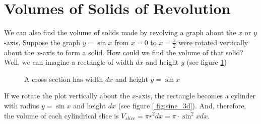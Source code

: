 \section{Volumes of Solids of Revolution}
We can also find the volume of solids made by revolving a graph about the $x$ 
or $y$-axis. Suppose the graph $y = \sin{x}$ from $x = 0$ to $x = \frac{\pi}{2}$ were 
rotated vertically about the $x$-axis to form a solid. How could we find the 
volume of that solid? Well, we can imagine a rectangle of width $dx$ and 
height $y$ (see figure \ref{fig:sine_2d})

\begin{center}
\begin{figure}[htbp]
    \centering
    \caption{A cross section has width $dx$ and height $y = \sin{x}$}
    \label{fig:sine_2d}
\end{figure}
\end{center}

If we rotate the plot vertically about the $x$-axis, the rectangle becomes a 
cylinder with radius $y = \sin{x}$ and height $dx$ (see figure \ref{
fig:sine_3d}). And, therefore, the volume of each cylindrical slice is $V_{
slice} = \pi r^2 dx = \pi \cdot \sin^2{x} dx$. 


